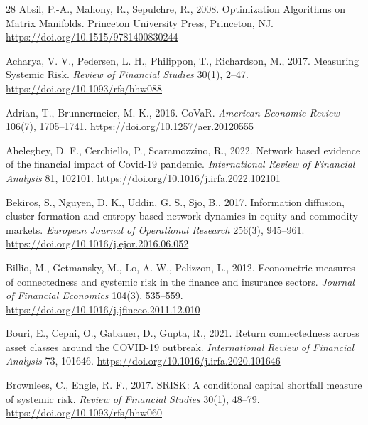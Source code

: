\documentclass[review,12pt,authoryear]{elsarticle}
\begin{document}

\begin{thebibliography}{28}
Absil, P.-A., Mahony, R., Sepulchre, R., 2008.
\newblock Optimization Algorithms on Matrix Manifolds.
\newblock Princeton University Press, Princeton, NJ. \url{https://doi.org/10.1515/9781400830244}

Acharya, V. V., Pedersen, L. H., Philippon, T., Richardson, M., 2017.
\newblock Measuring Systemic Risk.
\newblock \emph{Review of Financial Studies} 30(1), 2--47. \url{https://doi.org/10.1093/rfs/hhw088}

Adrian, T., Brunnermeier, M. K., 2016.
\newblock CoVaR.
\newblock \emph{American Economic Review} 106(7), 1705--1741. \url{https://doi.org/10.1257/aer.20120555}

Ahelegbey, D. F., Cerchiello, P., Scaramozzino, R., 2022.
\newblock Network based evidence of the financial impact of Covid-19 pandemic.
\newblock \emph{International Review of Financial Analysis} 81, 102101. \url{https://doi.org/10.1016/j.irfa.2022.102101}

Bekiros, S., Nguyen, D. K., Uddin, G. S., Sjo, B., 2017.
\newblock Information diffusion, cluster formation and entropy-based network dynamics in equity and commodity markets.
\newblock \emph{European Journal of Operational Research} 256(3), 945--961. \url{https://doi.org/10.1016/j.ejor.2016.06.052}

Billio, M., Getmansky, M., Lo, A. W., Pelizzon, L., 2012.
\newblock Econometric measures of connectedness and systemic risk in the finance and insurance sectors.
\newblock \emph{Journal of Financial Economics} 104(3), 535--559. \url{https://doi.org/10.1016/j.jfineco.2011.12.010}

Bouri, E., Cepni, O., Gabauer, D., Gupta, R., 2021.
\newblock Return connectedness across asset classes around the COVID-19 outbreak.
\newblock \emph{International Review of Financial Analysis} 73, 101646. \url{https://doi.org/10.1016/j.irfa.2020.101646}

Brownlees, C., Engle, R. F., 2017.
\newblock SRISK: A conditional capital shortfall measure of systemic risk.
\newblock \emph{Review of Financial Studies} 30(1), 48--79. \url{https://doi.org/10.1093/rfs/hhw060}


\end{thebibliography}
\end{document}
